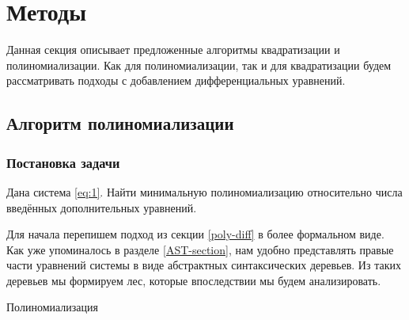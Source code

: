 
\section{Методы}

Данная секция описывает предложенные алгоритмы квадратизации и полиномиализации. Как для полиномиализации, так и для квадратизации будем рассматривать подходы с добавлением дифференциальных уравнений.

\subsection{Алгоритм полиномиализации} \label{poly-algo}

\subsubsection{Постановка задачи}

Дана система \ref{eq:1}. Найти минимальную полиномиализацию относительно числа введённых дополнительных уравнений.

Для начала перепишем подход из секции \ref{poly-diff} в более формальном виде. Как уже упоминалось в разделе \ref{AST-section}, нам удобно представлять правые части уравнений системы в виде абстрактных синтаксических деревьев. Из таких деревьев мы формируем лес, которые впоследствии мы будем анализировать.

\begin{algorithm}[H]
\SetAlgoLined
{}

\caption{Полиномиализация}
\end{algorithm}

